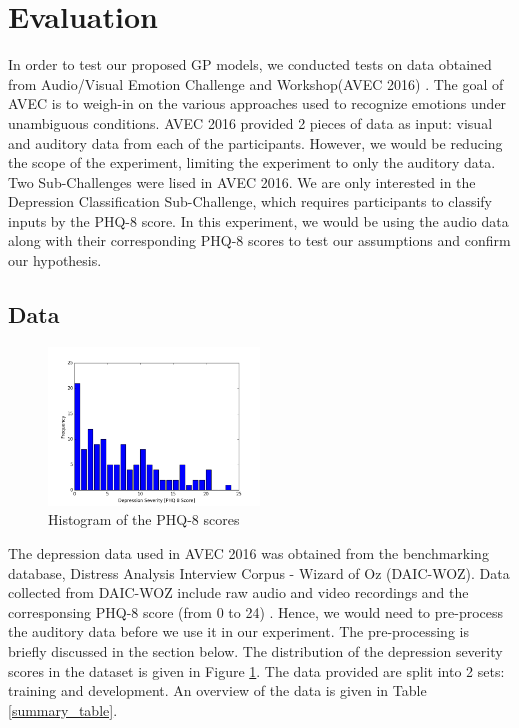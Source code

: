\documentclass{article}
\begin{document}
	\section{Evaluation}
	In order to test our proposed GP models, we conducted tests on data obtained from Audio/Visual Emotion Challenge and Workshop(AVEC 2016) \cite{avec2016}. 
	The goal of AVEC is to weigh-in on the various approaches used to recognize emotions under unambiguous conditions. 
	AVEC 2016 provided 2 pieces of data as input: visual and auditory data from each of the participants. 
	However, we would be reducing the scope of the experiment, limiting the experiment to only the auditory data. Two Sub-Challenges were lised in AVEC 2016. 
	We are only interested in the Depression Classification Sub-Challenge, which requires participants to classify inputs by the PHQ-8 score. 
	In this experiment, we would be using the audio data along with their corresponding PHQ-8 scores to test our assumptions and confirm our hypothesis.

	\subsection{Data}
	\begin{figure}[h]
	\center
 	\includegraphics[width=0.5\textwidth]{histogram_phq8}
	\caption{Histogram of the PHQ-8 scores}
	\label{histogram_phq8}
	\end{figure}
	
	The depression data used in AVEC 2016 was obtained from the benchmarking database, Distress Analysis Interview Corpus - Wizard of Oz (DAIC-WOZ). 
	Data collected from DAIC-WOZ include raw audio and video recordings and the corresponsing PHQ-8 score (from 0 to 24) \cite{jad2008}. Hence, we would 
	need to pre-process the auditory data before we use it in our experiment. The pre-processing is briefly discussed in the section below.
	The distribution of the depression severity scores in the dataset is given in Figure \ref{histogram_phq8}. 
	The data provided are split into 2 sets: training and development.
	An overview of the data is given in Table \ref{summary_table}.
\end{document}
